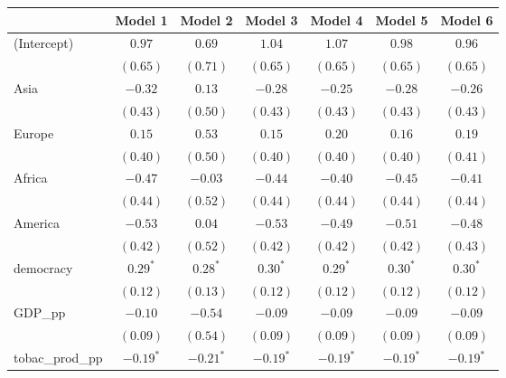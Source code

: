 
\begin{table}[!h]
\begin{center}
\begin{tabular}{l c c c c c c }
\toprule
 & Model 1 & Model 2 & Model 3 & Model 4 & Model 5 & Model 6 \\
\midrule
(Intercept)             & $0.97$       & $0.69$       & $1.04$       & $1.07$       & $0.98$       & $0.96$       \\
                        & $(0.65)$     & $(0.71)$     & $(0.65)$     & $(0.65)$     & $(0.65)$     & $(0.65)$     \\
Asia                    & $-0.32$      & $0.13$       & $-0.28$      & $-0.25$      & $-0.28$      & $-0.26$      \\
                        & $(0.43)$     & $(0.50)$     & $(0.43)$     & $(0.43)$     & $(0.43)$     & $(0.43)$     \\
Europe                  & $0.15$       & $0.53$       & $0.15$       & $0.20$       & $0.16$       & $0.19$       \\
                        & $(0.40)$     & $(0.50)$     & $(0.40)$     & $(0.40)$     & $(0.40)$     & $(0.41)$     \\
Africa                  & $-0.47$      & $-0.03$      & $-0.44$      & $-0.40$      & $-0.45$      & $-0.41$      \\
                        & $(0.44)$     & $(0.52)$     & $(0.44)$     & $(0.44)$     & $(0.44)$     & $(0.44)$     \\
America                 & $-0.53$      & $0.04$       & $-0.53$      & $-0.49$      & $-0.51$      & $-0.48$      \\
                        & $(0.42)$     & $(0.52)$     & $(0.42)$     & $(0.42)$     & $(0.42)$     & $(0.43)$     \\
democracy               & $0.29^{*}$   & $0.28^{*}$   & $0.30^{*}$   & $0.29^{*}$   & $0.30^{*}$   & $0.30^{*}$   \\
                        & $(0.12)$     & $(0.13)$     & $(0.12)$     & $(0.12)$     & $(0.12)$     & $(0.12)$     \\
GDP\_pp                 & $-0.10$      & $-0.54$      & $-0.09$      & $-0.09$      & $-0.09$      & $-0.09$      \\
                        & $(0.09)$     & $(0.54)$     & $(0.09)$     & $(0.09)$     & $(0.09)$     & $(0.09)$     \\
tobac\_prod\_pp         & $-0.19^{*}$  & $-0.21^{*}$  & $-0.19^{*}$  & $-0.19^{*}$  & $-0.19^{*}$  & $-0.19^{*}$  \\

\end{tabular}
\end{center}
\end{table}
